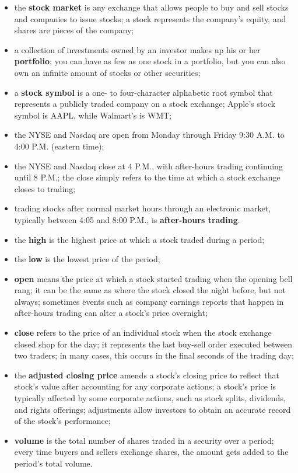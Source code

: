 \begin{itemize}
    \item the \textbf{stock market} is any exchange that allows people to buy 
and sell stocks and companies to issue stocks; a stock represents the company's 
equity, and shares are pieces of the company;
    \item a collection of investments owned by an investor makes up his or her 
\textbf{portfolio}; you can have as few as one stock in a portfolio, but you 
can also own an infinite amount of stocks or other securities;
    \item a \textbf{stock symbol} is a one- to four-character alphabetic root 
symbol that represents a publicly traded company on a stock exchange; Apple's 
stock symbol is AAPL, while Walmart's is WMT;
    \item the NYSE and Nasdaq are open from Monday through Friday 9:30 A.M. to 
4:00 P.M. (eastern time);
    \item the NYSE and Nasdaq close at 4 P.M., with after-hours trading 
continuing until 8 P.M.; the close simply refers to the time at which a stock 
exchange closes to trading;
    \item trading stocks after normal market hours through an electronic market, 
typically between 4:05 and 8:00 P.M., is \textbf{after-hours trading}.
    \item the \textbf{high} is the highest price at which a stock traded during 
a period;
    \item the \textbf{low} is the lowest price of the period;
    \item \textbf{open} means the price at which a stock started trading when 
the opening bell rang; it can be the same as where the stock closed the night 
before, but not always; sometimes events such as company earnings reports that 
happen in after-hours trading can alter a stock’s price overnight;
    \item \textbf{close} refers to the price of an individual stock when the 
stock exchange closed shop for the day; it represents the last buy-sell order 
executed between two traders; in many cases, this occurs in the final seconds of 
the trading day;
    \item the \textbf{adjusted closing price} amends a stock's closing price to 
reflect that stock's value after accounting for any corporate actions; a 
stock's price is typically affected by some corporate actions, such as 
stock splits, dividends, and rights offerings; adjustments allow investors to 
obtain an accurate record of the stock's performance;
    \item \textbf{volume} is the total number of shares traded in a security 
over a period; every time buyers and sellers exchange shares, the amount gets 
added to the period’s total volume.
\end{itemize}
